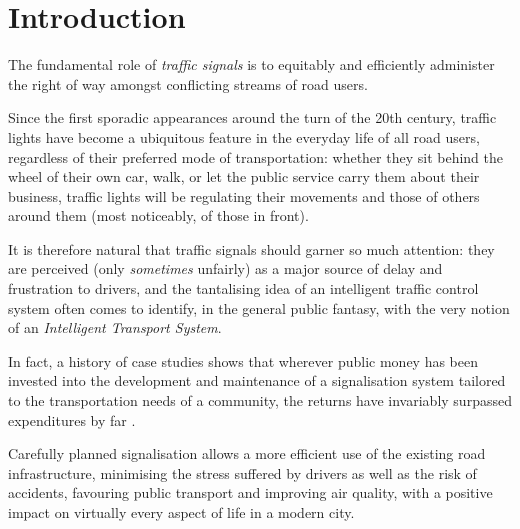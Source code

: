 \chapter*{Introduction}
The fundamental role of \emph{traffic signals} is to equitably and efficiently administer the right of way amongst conflicting streams of road users.

Since the first sporadic appearances around the turn of the 20th century, traffic lights have become a ubiquitous feature in the everyday life of all road users, regardless of their preferred mode of transportation: whether they sit behind the wheel of their own car, walk, or let the public service carry them about their business, traffic lights will be regulating their movements and those of others around them (most noticeably, of those in front).

It is therefore natural that traffic signals should garner so much attention: they are perceived (only \emph{sometimes} unfairly) as a major source of delay and frustration to drivers, and the tantalising idea of an intelligent traffic control system often comes to identify, in the general public fantasy, with the very notion of an \emph{Intelligent Transport System}.

In fact, a history of case studies shows that wherever public money has been invested into the development and maintenance of a signalisation system tailored to the transportation needs of a community, the returns have invariably surpassed expenditures by far \citep{koonce2008traffic}.

Carefully planned signalisation allows a more efficient use of the existing road infrastructure,
minimising the stress suffered by drivers as well as the risk of accidents,
favouring public transport and improving air quality, with a positive impact on virtually every aspect of life in a modern city.

